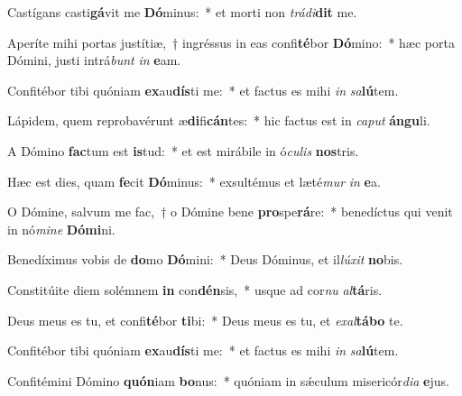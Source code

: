 \item Castígans casti\textbf{gá}vit me \textbf{Dó}minus:~* et morti non \textit{trá}\textit{di}\textbf{dit} me.
\item Aperíte mihi portas justítiæ,~† ingréssus in eas confi\textbf{té}bor \textbf{Dó}mino:~* hæc porta Dómini, justi intrá\textit{bunt} \textit{in} \textbf{e}am.
\item Confitébor tibi quóniam \textbf{ex}au\textbf{dís}ti me:~* et factus es mihi \textit{in} \textit{sa}\textbf{lú}tem.
\item Lápidem, quem reprobavérunt æ\textbf{di}fi\textbf{cán}tes:~* hic factus est in \textit{ca}\textit{put} \textbf{án}\textbf{gu}li.
\item A Dómino \textbf{fac}tum est \textbf{is}tud:~* et est mirábile in ó\textit{cu}\textit{lis} \textbf{nos}tris.
\item Hæc est dies, quam \textbf{fe}cit \textbf{Dó}minus:~* exsultémus et læté\textit{mur} \textit{in} \textbf{e}a.
\item O Dómine, salvum me fac,~† o Dómine bene \textbf{pro}spe\textbf{rá}re:~* benedíctus qui venit in nó\textit{mi}\textit{ne} \textbf{Dó}\textbf{mi}ni.
\item Benedíximus vobis de \textbf{do}mo \textbf{Dó}mini:~* Deus Dóminus, et il\textit{lú}\textit{xit} \textbf{no}bis.
\item Constitúite diem solémnem \textbf{in} con\textbf{dén}sis,~* usque ad cor\textit{nu} \textit{al}\textbf{tá}ris.
\item Deus meus es tu, et confi\textbf{té}bor \textbf{ti}bi:~* Deus meus es tu, et \textit{ex}\textit{al}\textbf{tá}\textbf{bo} te.
\item Confitébor tibi quóniam \textbf{ex}au\textbf{dís}ti me:~* et factus es mihi \textit{in} \textit{sa}\textbf{lú}tem.
\item Confitémini Dómino \textbf{quón}iam \textbf{bo}nus:~* quóniam in sǽculum misericór\textit{di}\textit{a} \textbf{e}jus.
